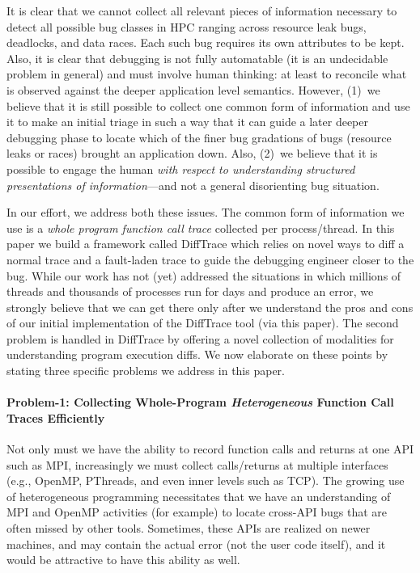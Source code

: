 It is clear that we cannot collect all relevant pieces of information
necessary to detect all possible bug classes in HPC ranging
across resource leak bugs,  deadlocks, and data races.
%
Each such bug requires its own attributes to be kept.
%
Also, it is clear that debugging is not fully automatable (it is
an undecidable problem in general) and must involve human thinking:
at least to reconcile what is observed against the deeper application
level semantics.
%
However, (1)~we believe that it is still possible to collect one common form
of information and use it to make an initial triage in such
a way that it can guide a later deeper debugging phase to locate
which of the finer bug gradations of bugs (resource leaks or races) brought
an application down.
%
Also, (2)~we believe that it is possible to engage the human {\em with respect
to understanding structured presentations of information}---and not a general
disorienting bug situation.


In our effort, we address both these issues.
%
The common form of information we use is a {\em whole program
function call trace} collected per process/thread.
%
In this paper we build a framework called DiffTrace which relies on
novel ways to diff a normal trace and a fault-laden trace to guide the
debugging engineer closer to the bug.
%
While our work has not (yet) addressed the situations in
which millions of threads and thousands of processes run
for days and produce an error,
we strongly believe that we can get there only 
after we understand the pros and cons of our initial
implementation of the  DiffTrace tool (via this paper).
%
The second problem is handled in DiffTrace by offering a novel
collection of modalities for understanding program execution diffs.
%
We now elaborate on these points by stating three specific
problems we address in this paper.



\paragraph{Problem-1: Collecting Whole-Program {\em Heterogeneous} Function Call Traces
Efficiently\/} Not only must we have the ability
to record function calls and returns at one
API such as MPI, increasingly we must collect calls/returns at multiple
interfaces (e.g., OpenMP, PThreads, and even inner levels such as TCP).
%
The growing use of heterogeneous programming necessitates that we have
an understanding of MPI and OpenMP activities (for example) to locate cross-API
bugs that are often missed by other tools.
%
Sometimes, these APIs are realized on newer machines, and may contain the
actual error (not the user code itself), and it would be attractive to have
this ability as well.





